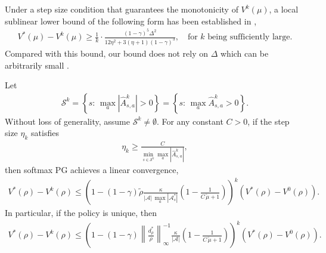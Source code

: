 \begin{remark}
Under a  step size condition that guarantees the monotonicity of $V^k(\mu)$, a local sublinear lower bound of the following form has been established in \textup{\cite{Mei_Xiao_Szepesvari_Schuurmans_2020}},
\begin{align*}
        V^*(\mu) - V^k(\mu) \geq \frac{1}{k} \cdot \frac{(1-\gamma)^5 \Delta^2}{12\eta^2 + 3(\eta+1)(1-\gamma)^3}, \quad \mbox{for $k$ being sufficiently large}.
\end{align*}
Compared with this bound, our bound does not rely on $\Delta$ which can be arbitrarily small \textup{\cite{Johnson_Pike-Burke_Rebeschini_2023}}.
\end{remark}
\begin{theorem}\label{thm:softmaxPG-linear}
    Let 
\begin{align*}
{\mathcal{S}^k}=\left\{s:\,\max_a|\hat{A}^k_{s,a}|>0\right\}=\left\{s:\,\max_a\hat{A}^k_{s,a}>0\right\}. 
\end{align*}
Without loss of generality, assume $\mathcal{S}^k\neq \emptyset$.  For any constant $C>0$, if the step size $\eta_k$ satisfies 
\begin{align*}
\eta_k\geq \frac{C}{\min_{s\in\mathcal{S}^k}\max_a|\hat{A}^k_{s,a}|},
\end{align*}
then softmax PG achieves a linear convergence, 
\begin{align*}
V^*(\rho) - V^k(\rho) \leq \left(1-(1-\gamma)\tilde{\rho}\frac{\kappa}{|\mathcal{A}|\,\max_a|\mathcal{A}_s^*|}\left(1-\frac{1}{C\,\tilde{\mu}+1}\right)\right)^k\left(V^*(\rho)-V^0(\rho)\right).
\end{align*}
In particular, if the policy is unique, then 
\begin{align*}
V^*(\rho) - V^k(\rho) \leq \left(1-(1-\gamma)\left\|\frac{d_\rho^*}{\rho}\right\|_\infty^{-1}\frac{\kappa}{|\mathcal{A}|}\left(1-\frac{1}{C\,\tilde{\mu}+1}\right)\right)^k\left(V^*(\rho)-V^0(\rho)\right).
\end{align*}

\end{theorem}

